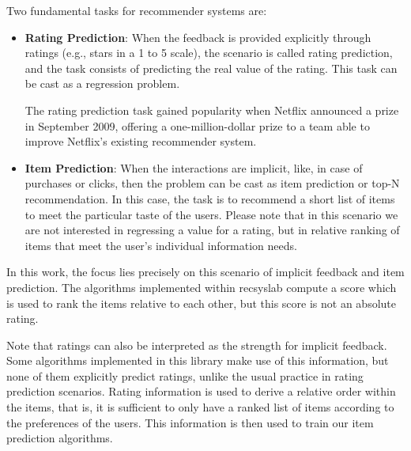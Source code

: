 Two fundamental tasks for recommender systems are:
\begin{itemize}
    \item \textbf{Rating Prediction}:
When the feedback is provided explicitly through ratings (e.g., stars in a 1 to 5 scale), the scenario is called rating prediction, and the task consists of predicting the real value of the rating. This task can be cast as a regression problem.
  
The rating prediction task gained popularity when Netflix announced a prize~\cite{netflixprize}
in September 2009, offering a one-million-dollar prize to a team able to improve Netflix's existing recommender system.

    \item \textbf{Item Prediction}:
When the interactions are implicit, like, in case of purchases or clicks, then the problem can be cast as item prediction or top-N recommendation. In this case, the task is to recommend a short list of items to meet the particular taste of the users. Please note that in this scenario we are not interested in regressing a value for a rating, but in relative ranking of items that meet the user's individual information needs. 

\end{itemize}
In this work, the focus lies precisely on this scenario of implicit feedback and item prediction. The algorithms implemented within recsyslab compute a score which is used to rank the items relative to each other, but this score is not an absolute rating.

Note that ratings can also be interpreted as the strength for implicit feedback. Some algorithms implemented
in this library make use of this information, but none of them explicitly predict ratings, unlike the usual practice in rating prediction scenarios. Rating information is used to derive a relative order within the items, that is, it is sufficient to only have a ranked list of items according to the preferences of the users. This information is then used to train our item prediction algorithms. 


